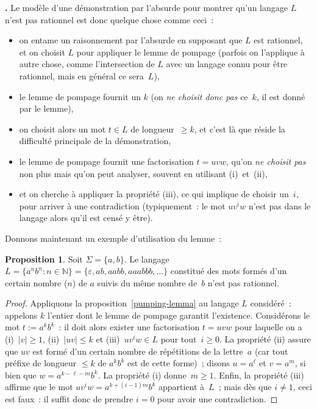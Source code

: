 \documentclass[12pt,a4paper]{article}
\theoremstyle{definition}
\newcommand\thingy{%
\refstepcounter{comcnt}\medskip\noindent\textbf{\thecomcnt.} }
\newtheorem{prop}[comcnt]{Proposition}
\begin{document}
\thingy Le modèle d'une démonstration par l'absurde pour montrer qu'un
langage $L$ n'est pas rationnel est donc quelque chose comme ceci :
\begin{itemize}
\item on entame un raisonnement par l'absurde en supposant que $L$ est
  rationnel, et on choisit $L$ pour appliquer le lemme de pompage
  (parfois on l'applique à autre chose, comme l'intersection de $L$
  avec un langage connu pour être rationnel, mais en général ce
  sera $L$),
\item le lemme de pompage fournit un $k$ (on \emph{ne choisit donc
  pas} ce $k$, il est donné par le lemme),
\item on choisit alors un mot $t \in L$ de longueur $\geq k$, et c'est
  là que réside la difficulté principale de la démonstration,
\item le lemme de pompage fournit une factorisation $t = uvw$, qu'on
  \emph{ne choisit pas} non plus mais qu'on peut analyser, souvent en
  utilisant (i) et (ii),
\item et on cherche à appliquer la propriété (iii), ce qui implique de
  choisir un $i$, pour arriver à une contradiction (typiquement : le
  mot $uv^i w$ n'est pas dans le langage alors qu'il est censé y
  être).
\end{itemize}

\smallskip

Donnons maintenant un exemple d'utilisation du lemme :

\begin{prop}\label{example-of-pumping-lemma}
Soit $\Sigma = \{a,b\}$.  Le langage $L = \{a^n b^n : n\in\mathbb{N}\}
= \{\varepsilon, ab, aabb, aaabbb,\ldots\}$ constitué des mots formés
d'un certain nombre ($n$) de $a$ suivis du même nombre de $b$ n'est
pas rationnel.
\end{prop}
\begin{proof}
Appliquons la proposition \ref{pumping-lemma} au langage $L$
considéré : appelons $k$ l'entier dont le lemme de pompage garantit
l'existence.  Considérons le mot $t := a^k b^k$ : il doit alors
exister une factorisation $t = uvw$ pour laquelle on a (i) $|v|\geq
1$, (ii) $|uv|\leq k$ et (iii) $uv^iw \in L$ pour tout $i\geq 0$.  La
propriété (ii) assure que $uv$ est formé d'un certain nombre de
répétitions de la lettre $a$ (car tout préfixe de longueur $\leq k$ de
$a^k b^k$ est de cette forme) ; disons $u = a^\ell$ et $v = a^m$, si
bien que $w = a^{k-\ell-m} b^k$.  La propriété (i) donne $m\geq 1$.
Enfin, la propriété (iii) affirme que le mot $uv^iw = a^{k+(i-1)m}
b^k$ appartient à $L$ ; mais dès que $i\neq 1$, ceci est faux : il
suffit donc de prendre $i=0$ pour avoir une contradiction.
\end{proof}
\end{document}
